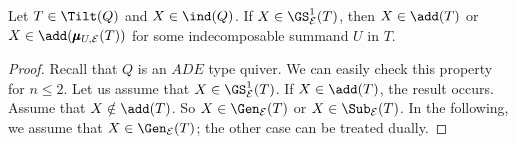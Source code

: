 

\begin{lemma} \label{lem:crucialTreaching}
    Let $T \in \Tilt(Q)$ and $X \in \ind(Q)$. If $X \in \GS_\mathcal{E}^1(T)$, then $X \in \add(T)$ or $X \in \add(\pmb{\mu}_{U,\mathcal{E}}(T))$ for some indecomposable summand $U$ in $T$.
\end{lemma}

\begin{proof}
    Recall that $Q$ is an $ADE$ type quiver. We can easily check this property for $n \leqslant 2$. Let us assume that $X \in \GS_\mathcal{E}^1(T)$. If $X \in \add(T)$, the result occurs. Assume that $X \notin \add(T)$. So $X \in \Gen_\mathcal{E}(T)$ or $X \in \Sub_\mathcal{E}(T)$. In the following, we assume that $X \in \Gen_\mathcal{E}(T)$; the other case can be treated dually.


\end{proof}
